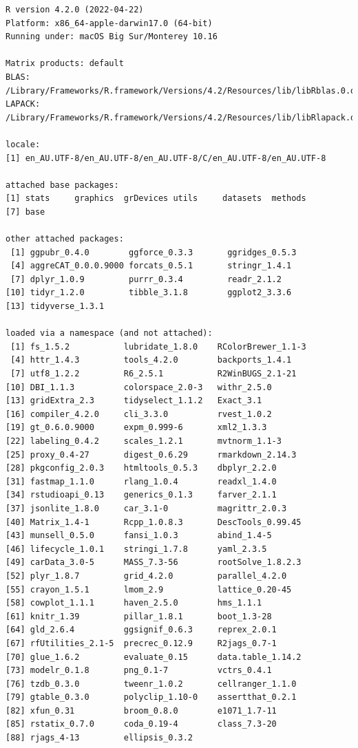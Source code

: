 \documentclass[article]{jss}
\begin{document}
\begin{verbatim}
R version 4.2.0 (2022-04-22)
Platform: x86_64-apple-darwin17.0 (64-bit)
Running under: macOS Big Sur/Monterey 10.16

Matrix products: default
BLAS:   /Library/Frameworks/R.framework/Versions/4.2/Resources/lib/libRblas.0.dylib
LAPACK: /Library/Frameworks/R.framework/Versions/4.2/Resources/lib/libRlapack.dylib

locale:
[1] en_AU.UTF-8/en_AU.UTF-8/en_AU.UTF-8/C/en_AU.UTF-8/en_AU.UTF-8

attached base packages:
[1] stats     graphics  grDevices utils     datasets  methods  
[7] base     

other attached packages:
 [1] ggpubr_0.4.0        ggforce_0.3.3       ggridges_0.5.3     
 [4] aggreCAT_0.0.0.9000 forcats_0.5.1       stringr_1.4.1      
 [7] dplyr_1.0.9         purrr_0.3.4         readr_2.1.2        
[10] tidyr_1.2.0         tibble_3.1.8        ggplot2_3.3.6      
[13] tidyverse_1.3.1    

loaded via a namespace (and not attached):
 [1] fs_1.5.2           lubridate_1.8.0    RColorBrewer_1.1-3
 [4] httr_1.4.3         tools_4.2.0        backports_1.4.1   
 [7] utf8_1.2.2         R6_2.5.1           R2WinBUGS_2.1-21  
[10] DBI_1.1.3          colorspace_2.0-3   withr_2.5.0       
[13] gridExtra_2.3      tidyselect_1.1.2   Exact_3.1         
[16] compiler_4.2.0     cli_3.3.0          rvest_1.0.2       
[19] gt_0.6.0.9000      expm_0.999-6       xml2_1.3.3        
[22] labeling_0.4.2     scales_1.2.1       mvtnorm_1.1-3     
[25] proxy_0.4-27       digest_0.6.29      rmarkdown_2.14.3  
[28] pkgconfig_2.0.3    htmltools_0.5.3    dbplyr_2.2.0      
[31] fastmap_1.1.0      rlang_1.0.4        readxl_1.4.0      
[34] rstudioapi_0.13    generics_0.1.3     farver_2.1.1      
[37] jsonlite_1.8.0     car_3.1-0          magrittr_2.0.3    
[40] Matrix_1.4-1       Rcpp_1.0.8.3       DescTools_0.99.45 
[43] munsell_0.5.0      fansi_1.0.3        abind_1.4-5       
[46] lifecycle_1.0.1    stringi_1.7.8      yaml_2.3.5        
[49] carData_3.0-5      MASS_7.3-56        rootSolve_1.8.2.3 
[52] plyr_1.8.7         grid_4.2.0         parallel_4.2.0    
[55] crayon_1.5.1       lmom_2.9           lattice_0.20-45   
[58] cowplot_1.1.1      haven_2.5.0        hms_1.1.1         
[61] knitr_1.39         pillar_1.8.1       boot_1.3-28       
[64] gld_2.6.4          ggsignif_0.6.3     reprex_2.0.1      
[67] rfUtilities_2.1-5  precrec_0.12.9     R2jags_0.7-1      
[70] glue_1.6.2         evaluate_0.15      data.table_1.14.2 
[73] modelr_0.1.8       png_0.1-7          vctrs_0.4.1       
[76] tzdb_0.3.0         tweenr_1.0.2       cellranger_1.1.0  
[79] gtable_0.3.0       polyclip_1.10-0    assertthat_0.2.1  
[82] xfun_0.31          broom_0.8.0        e1071_1.7-11      
[85] rstatix_0.7.0      coda_0.19-4        class_7.3-20      
[88] rjags_4-13         ellipsis_0.3.2    
\end{verbatim}


\renewcommand\refname{Acknowledgments}
  
\end{document}
